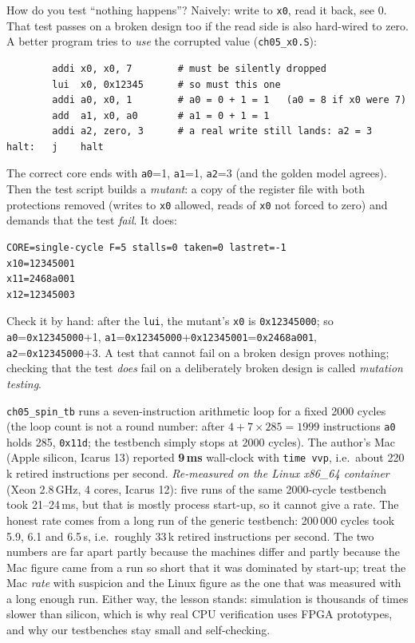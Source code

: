 \begin{example}\label{ex:x0test05}
How do you test ``nothing happens''? Naively: write to \texttt{x0},
read it back, see 0. That test passes on a broken design too if the
read side is also hard-wired to zero. A better program tries to
\emph{use} the corrupted value (\texttt{ch05\_x0.S}):
\begin{lstlisting}
        addi x0, x0, 7        # must be silently dropped
        lui  x0, 0x12345      # so must this one
        addi a0, x0, 1        # a0 = 0 + 1 = 1   (a0 = 8 if x0 were 7)
        add  a1, x0, a0       # a1 = 0 + 1 = 1
        addi a2, zero, 3      # a real write still lands: a2 = 3
halt:   j    halt
\end{lstlisting}
The correct core ends with \texttt{a0}=1, \texttt{a1}=1, \texttt{a2}=3
(and the golden model agrees). Then the test script builds a
\emph{mutant}: a copy of the register file with both protections
removed (writes to \texttt{x0} allowed, reads of \texttt{x0} not forced
to zero) and demands that the test \emph{fail}. It does:
\begin{lstlisting}
CORE=single-cycle F=5 stalls=0 taken=0 lastret=-1
x10=12345001
x11=2468a001
x12=12345003
\end{lstlisting}
Check it by hand: after the \texttt{lui}, the mutant's \texttt{x0} is
\texttt{0x12345000}; so \texttt{a0}=\texttt{0x12345000}+1,
\texttt{a1}=\texttt{0x12345000}+\texttt{0x12345001}=\texttt{0x2468a001},
\texttt{a2}=\texttt{0x12345000}+3. A test that cannot fail on a broken
design proves nothing; checking that the test \emph{does} fail on a
deliberately broken design is called \emph{mutation testing}.
\end{example}

\begin{example}\label{ex:simspeed05}
\texttt{ch05\_spin\_tb} runs a seven-instruction arithmetic loop for a
fixed 2000 cycles (the loop count is not a round number: after
$4+7\times285=1999$ instructions \texttt{a0} holds 285, \texttt{0x11d};
the testbench simply stops at 2000 cycles). The author's Mac
(Apple silicon, Icarus 13) reported \textbf{9\,ms} wall-clock with
\texttt{time vvp}, i.e.\ about 220\,k retired instructions per second.
\emph{Re-measured on the Linux x86\_64 container} (Xeon 2.8\,GHz,
4 cores, Icarus 12): five runs of the same 2000-cycle testbench took
21--24\,ms, but that is mostly process start-up, so it cannot give a
rate. The honest rate comes from a long run of the generic testbench:
200\,000 cycles took 5.9, 6.1 and 6.5\,s, i.e.\ roughly 33\,k retired
instructions per second. The two numbers are far apart partly because
the machines differ and partly because the Mac figure came from a
run so short that it was dominated by start-up; treat the Mac
\emph{rate} with suspicion and the Linux figure as the one that was
measured with a long enough run. Either way, the lesson stands:
simulation is thousands of times slower than silicon, which is why
real CPU verification uses FPGA prototypes, and why our testbenches
stay small and self-checking.
\end{example}

